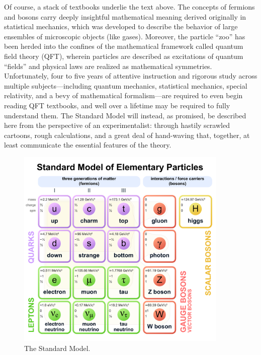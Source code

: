 Of course, a stack of textbooks underlie the text above.
The concepts of fermions and bosons carry deeply insightful mathematical meaning derived originally in statistical mechanics, which was developed to describe the behavior of large ensembles of microscopic objects (like gases). 
Moreover, the particle ``zoo'' has been herded into the confines of the mathematical framework called quantum field theory (QFT), wherein particles are described as excitations of quantum ``fields'' and physical laws are realized as mathematical symmetries. 
Unfortunately, four to five years of attentive instruction and rigorous study across multiple subjects---including quantum mechanics, statistical mechanics, special relativity, and a bevy of mathematical formalism---are required to even begin reading QFT textbooks, and well over a lifetime may be required to fully understand them\footnotemark{}. 
The Standard Model will instead, as promised, be described here from the perspective of an experimentalist: through hastily scrawled cartoons, rough calculations, and a great deal of hand-waving that, together, at least communicate the essential features of the theory. 

\begin{figure}[htb]
    \centering
    \includegraphics[width=0.9\textwidth]{fig/standard_model.pdf}
    \caption{
        The Standard Model.
    }
    \label{fig:standard_model}
\end{figure}

